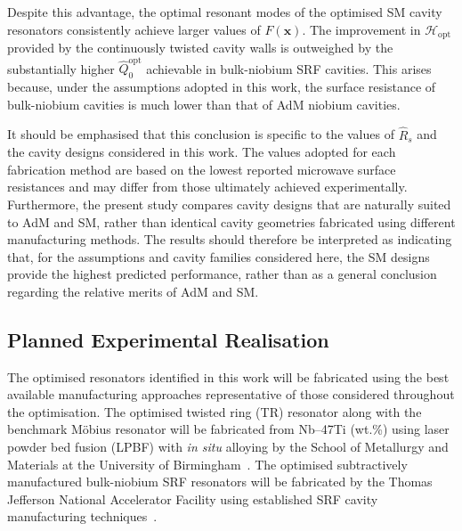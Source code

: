 \documentclass[
  aps,
  physrev,
  reprint,
  superscriptaddress,
  nofootinbib,
  amsmath,
  amssymb
]{revtex4-2}
\begin{document}
Despite this advantage, the optimal resonant modes of the optimised SM cavity resonators consistently achieve larger values of $F(\mathbf{x})$. The improvement in $\mathscr H_{\mathrm{opt}}$ provided by the continuously twisted cavity walls is outweighed by the substantially higher $\hat Q_0^{\mathrm{opt}}$ achievable in bulk-niobium SRF cavities. This arises because, under the assumptions adopted in this work, the surface resistance of bulk-niobium cavities is much lower than that of AdM niobium cavities. 

It should be emphasised that this conclusion is specific to the values of $\hat R_s$ and the cavity designs considered in this work. The values adopted for each fabrication method are based on the lowest reported microwave surface resistances and may differ from those ultimately achieved experimentally. Furthermore, the present study compares cavity designs that are naturally suited to AdM and SM, rather than identical cavity geometries fabricated using different manufacturing methods. The results should therefore be interpreted as indicating that, for the assumptions and cavity families considered here, the SM designs provide the highest predicted performance, rather than as a general conclusion regarding the relative merits of AdM and SM. 

\subsection{Planned Experimental Realisation}
\label{sec:disc_fabrication}

The optimised resonators identified in this work will be fabricated using the best available manufacturing approaches representative of those considered throughout the optimisation. The optimised twisted ring (TR) resonator along with the benchmark M\"obius resonator will be fabricated from Nb--47Ti (wt.\%) using laser powder bed fusion (LPBF) with \textit{in situ} alloying by the School of Metallurgy and Materials at the University of Birmingham~\cite{Ersoz2026}. The optimised subtractively manufactured bulk-niobium SRF resonators will be fabricated by the Thomas Jefferson National Accelerator Facility using established SRF cavity manufacturing techniques~\cite{Ciovati2018,Ciovati2007}.




\end{document}
